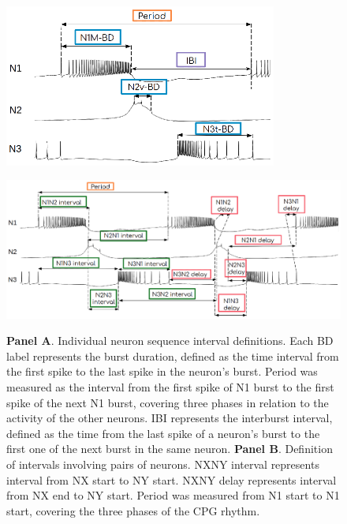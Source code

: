 \begin{figure}[hbt!]
	\centering
	\begin{minipage}{\textwidth}
		\centering
		\includegraphics[width=0.8\textwidth]{img/methods-paper-modelo/figure4a.eps} 
		\label{fig:intervals_bd}
	\end{minipage}
	
	\vspace{1cm}
	\begin{minipage}[t]{\textwidth}
		\centering
		\includegraphics[width=\textwidth]{img/methods-paper-modelo/figure4b.eps} 
		\label{fig:intervals_der}
	\end{minipage}
	
	\caption{\textbf{Panel A}. Individual neuron sequence interval definitions. Each BD label represents the burst duration, defined as the time interval from the first spike to the last spike in the neuron's burst. Period was measured as the interval from the first spike of N1 burst to the first spike of the next N1 burst, covering three phases %
		in relation to the activity of the other neurons. IBI represents the interburst interval, defined as the time from the last spike of a neuron's burst to the first one of the next burst in the same neuron.
		\textbf{Panel B}. Definition of intervals involving pairs of neurons. NXNY interval represents interval from NX start to NY start. NXNY delay represents interval from NX end to NY start. Period was measured from N1 start to N1 start, covering the three phases of the CPG rhythm.
	}
	
	\label{fig:intervals}
\end{figure}


